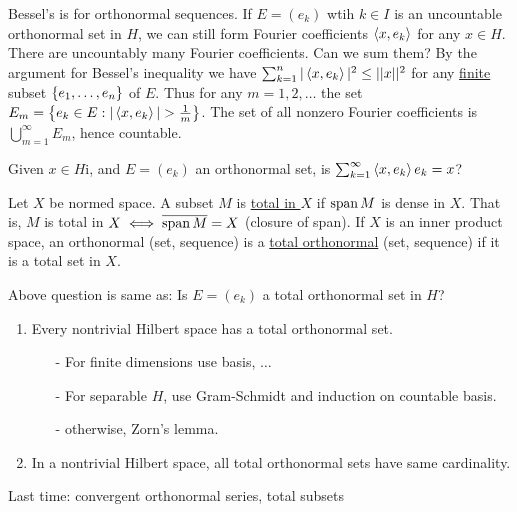 \documentclass[]{article}
\begin{document}
\begin{note}
	Bessel's is for orthonormal sequences. If $E = (e_k)$ wtih $k\in I$ is an uncountable orthonormal set in $H$, we can still form Fourier coefficients $\left\langle x,e_k \right\rangle$ for any $x\in H$. There are uncountably many Fourier coefficients. Can we sum them?
	By the argument for Bessel's inequality we have $\sum_{k=1}^n |\left\langle x,e_k \right\rangle|^2 \leq ||x||^2$ for any \ul{finite} subset $\left\{ e_1,\dots,e_n \right\}$ of $E$.
	Thus for any $m=1,2,\dots$ the set $E_m = \setc{e_k\in E}{|\gen{x,e_k}|>\frac1m}$.
	The set of all nonzero Fourier coefficients is $\bigcup_{m=1}^\infty E_m$, hence countable.
\end{note}

Given $x\in H$i, and $E=(e_k)$ an orthonormal set, is $\sum_{k=1}^\infty \left\langle x,e_k \right\rangle e_k = x$?

\begin{definition}
	Let $X$ be normed space. A subset $M$ is \ul{total in $X$} if $\text{span}\,M$ is dense in $X$. That is, $M$ is total in $X\iff\overline{\text{span}\,M} = X$ (closure of span).
		If $X$ is an inner product space, an orthonormal (set, sequence) is a \ul{total orthonormal} (set, sequence) if it is a total set in $X$.
\end{definition}
Above question is same as: Is $E=(e_k)$ a total orthonormal set in $H$?

\begin{enumerate}
	\item Every nontrivial Hilbert space has a total orthonormal set.
		\begin{enumerate}
			\item[-] For finite dimensions use basis, $\dots$
			\item[-] For separable $H$, use Gram-Schmidt and induction on countable basis.
			\item[-] otherwise, Zorn's lemma.
		\end{enumerate}
	\item In a nontrivial Hilbert space, all total orthonormal sets have same cardinality.
\end{enumerate}

Last time: convergent orthonormal series, total subsets
\end{document}
